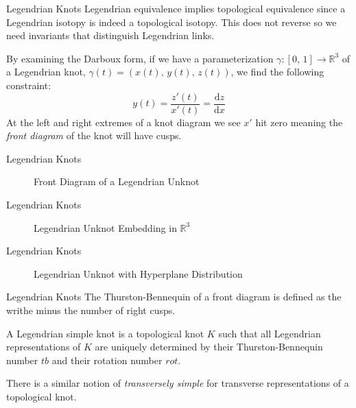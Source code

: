 \documentclass{beamer}
\begin{document}
    \begin{frame}{Legendrian Knots}
        Legendrian equivalence implies topological equivalence since a
        Legendrian isotopy is indeed a topological isotopy. This does not
        reverse so we need invariants that distinguish Legendrian links.
        \par\hfill\par
        By examining the Darboux form, if we have a parameterization
        $\gamma:[0,\,1]\rightarrow\mathbb{R}^{3}$ of a Legendrian knot,
        $\gamma(t)=(x(t),\,y(t),\,z(t))$, we find the following constraint:
        \begin{equation}
            y(t)=\frac{z'(t)}{x'(t)}=\frac{\textrm{d}z}{\textrm{d}x}
        \end{equation}
        At the left and right extremes of a knot diagram we see $x'$ hit zero
        meaning the \textit{front diagram} of the knot will have cusps.
    \end{frame}
    \begin{frame}{Legendrian Knots}
        \begin{figure}
            \centering
            \caption{Front Diagram of a Legendrian Unknot}
        \end{figure}
    \end{frame}
    \begin{frame}{Legendrian Knots}
        \begin{figure}
            \centering
            \caption{Legendrian Unknot Embedding in $\mathbb{R}^{3}$}
        \end{figure}
    \end{frame}
    \begin{frame}{Legendrian Knots}
        \begin{figure}
            \centering
            \caption{Legendrian Unknot with Hyperplane Distribution}
        \end{figure}
    \end{frame}
    \begin{frame}{Legendrian Knots}
        The Thurston-Bennequin of a front diagram is defined as the writhe
        minus the number of right cusps.
        \begin{definition}
            A Legendrian simple knot is a topological knot $K$ such that all
            Legendrian representations of $K$ are uniquely determined by their
            Thurston-Bennequin number $tb$ and their rotation number $rot$.
        \end{definition}
        There is a similar notion of \textit{transversely simple} for transverse
        representations of a topological knot.
    \end{frame}
\end{document}
